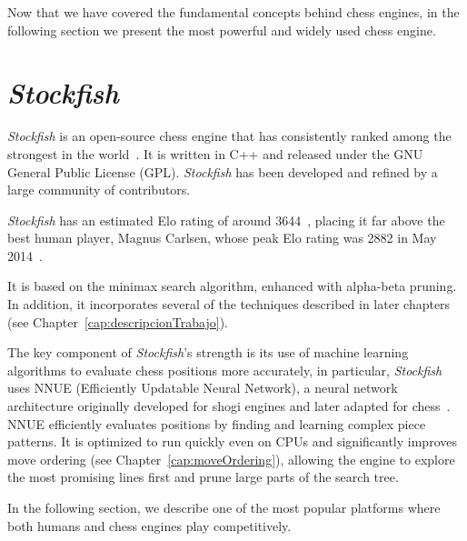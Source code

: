 \newpage

Now that we have covered the fundamental concepts behind chess engines, in the following section we present the most powerful and widely used chess engine.

\section{\textit{Stockfish}}
\label{sec:stockfish}

\par \textit{Stockfish} is an open-source chess engine that has consistently ranked among the strongest in the world~\cite{Stockfish}. It is written in C++ and released under the GNU General Public License (GPL). \textit{Stockfish} has been developed and refined by a large community of contributors.

\vspace{1em}

\par \textit{Stockfish} has an estimated Elo rating of around 3644~\cite{StockfishElo}, placing it far above the best human player, Magnus Carlsen, whose peak Elo rating was 2882 in May 2014~\cite{MagnusCarlsenElo}.

\vspace{1em}

\par It is based on the minimax search algorithm, enhanced with alpha-beta pruning. In addition, it incorporates several of the techniques described in later chapters (see Chapter~\cref{cap:descripcionTrabajo}).

\vspace{1em}

\par The key component of \textit{Stockfish}'s strength is its use of machine learning algorithms to evaluate chess positions more accurately, in particular, \textit{Stockfish} uses NNUE (Efficiently Updatable Neural Network), a neural network architecture originally developed for shogi engines and later adapted for chess~\cite{NNUE}. NNUE efficiently evaluates positions by finding and learning complex piece patterns. It is optimized to run quickly even on CPUs and significantly improves move ordering (see Chapter~\cref{cap:moveOrdering}), allowing the engine to explore the most promising lines first and prune large parts of the search tree.

\vspace{2em}

In the following section, we describe one of the most popular platforms where both humans and chess engines play competitively.

